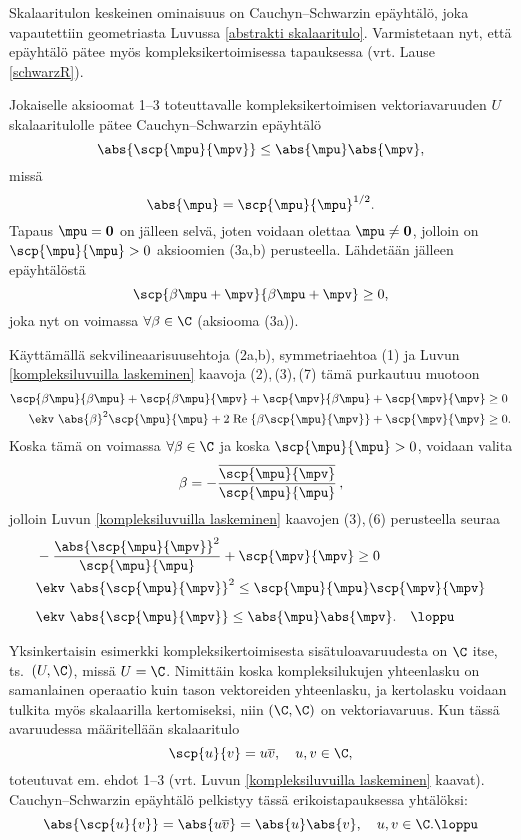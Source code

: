 Skalaaritulon keskeinen ominaisuus on Cauchyn--Schwarzin epäyhtälö, joka vapautettiin 
geometriasta Luvussa \ref{abstrakti skalaaritulo}. Varmistetaan nyt, että epäyhtälö pätee myös
kompleksikertoimisessa tapauksessa (vrt. Lause \ref{schwarzR}).
\begin{Lause} \label{schwarzC} 
Jokaiselle aksioomat 1--3 toteuttavalle kompleksikertoimisen vektoriavaruuden $U$
skalaaritulolle pätee Cauchyn--Schwarzin epäyhtälö
\[
\abs{\scp{\mpu}{\mpv}} \leq \abs{\mpu} \abs{\mpv},
\]
missä
\[
\abs{\mpu}=\scp{\mpu}{\mpu}^{1/2}.
\]
\tod
Tapaus $\mpu = \mathbf{0}$ on jälleen selvä, joten voidaan olettaa $\mpu \neq \mathbf{0}$, 
jolloin on $\scp{\mpu}{\mpu}>0$ aksioomien (3a,b) perusteella. Lähdetään jälleen epäyhtälöstä
\[
\scp{\beta \mpu + \mpv}{\beta \mpu + \mpv} \geq 0,
\]
joka nyt on voimassa $\forall \beta \in \C$ (aksiooma (3a)).

Käyttämällä sekvilineaarisuusehtoja (2a,b), symmetriaehtoa (1) ja Luvun 
\ref{kompleksiluvuilla laskeminen} kaavoja (2),\,(3),\,(7) tämä purkautuu muotoon
\begin{align*}
\scp{\beta \mpu}{\beta \mpu} + \scp{\beta \mpu}{\mpv} + \scp{\mpv}{\beta \mpu} 
                                                      + \scp{\mpv}{\mpv} &\geq 0 \\
\ekv \ \abs{\beta}^2 \scp{\mpu}{\mpu} + 2 \; \text{Re} \; \{ \beta \scp{\mpu}{\mpv} \} 
                                      + \scp{\mpv}{\mpv} &\geq 0.
\end{align*}
Koska tämä on voimassa $\forall \beta \in \C$ ja koska $\scp{\mpu}{\mpu} > 0$, voidaan valita
\[
\beta = - \frac{\overline{\scp{\mpu}{\mpv}}}{\scp{\mpu}{\mpu}}\,,
\]
jolloin Luvun \ref{kompleksiluvuilla laskeminen} kaavojen (3),\,(6) perusteella seuraa
\begin{align*}
&-\frac{\abs{\scp{\mpu}{\mpv}}^2}{\scp{\mpu}{\mpu}} + \scp{\mpv}{\mpv} \geq 0 \\
& \ekv \ \abs{\scp{\mpu}{\mpv}}^2 \leq \scp{\mpu}{\mpu} \scp{\mpv}{\mpv} \\[2mm]
& \ekv \ \abs{\scp{\mpu}{\mpv}} \leq \abs{\mpu} \abs{\mpv}. \quad\loppu
\end{align*}
\end{Lause}
\begin{Exa} Yksinkertaisin esimerkki kompleksikertoimisesta sisätuloavaruudesta on $\C$ itse,
ts.\ $(U, \C)$, missä $U=\C$. Nimittäin koska kompleksilukujen yhteenlasku on samanlainen 
operaatio kuin tason vektoreiden yhteenlasku, ja kertolasku voidaan tulkita myös skalaarilla
kertomiseksi, niin $(\C,\C)$ on vektoriavaruus. Kun tässä avaruudessa määritellään skalaaritulo
\[
\scp{u}{v} = u \overline{v}, \quad u,v \in \C,
\]
toteutuvat em. ehdot 1--3 (vrt. Luvun \ref{kompleksiluvuilla laskeminen} kaavat). 
Cauchyn--Schwarzin epäyhtälö pelkistyy tässä erikoistapauksessa yhtälöksi:
\[
\abs{\scp{u}{v}} = \abs{u \overline{v}} = \abs{u}\abs{v}, \quad u,v \in \C. \loppu
\]
\end{Exa}
